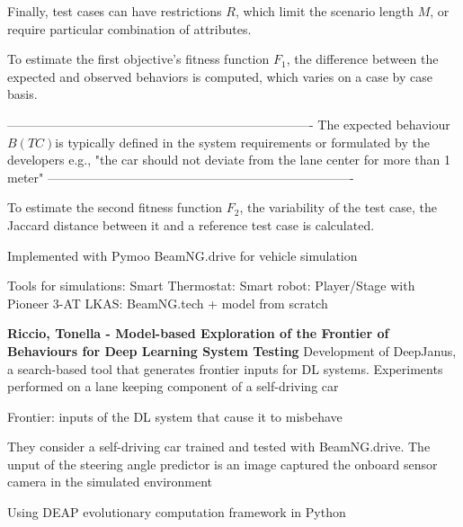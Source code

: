 Finally, test cases can have restrictions $ R $, which limit the scenario length $ M $, or require particular combination of attributes.

To estimate the first objective's fitness function $ F_1 $, the difference between the expected and observed behaviors is computed, which varies on a case by case basis.

-------------------------------------------------------------------------\newline
The expected behaviour $ B(TC) $is typically defined in the system
requirements or formulated by the developers e.g., "the car
should not deviate from the lane center for more than 1
meter"
-------------------------------------------------------------------------\newline

To estimate the second fitness function $ F_2 $, the variability of the test case, the Jaccard distance between it and a reference test case is calculated.

Implemented with Pymoo
BeamNG.drive for vehicle simulation

Tools for simulations:
Smart Thermostat: 
Smart robot: Player/Stage with Pioneer 3-AT
LKAS: BeamNG.tech + model from scratch



\textbf{Riccio, Tonella - Model-based Exploration of the Frontier of Behaviours for Deep Learning System Testing}
Development of DeepJanus, a search-based tool that generates frontier inputs for DL systems.
Experiments performed on a lane keeping component of a self-driving car 

Frontier: inputs of the DL system that cause it to misbehave

They consider a self-driving car trained and tested with BeamNG.drive. The unput of the steering angle predictor is an image captured the onboard sensor camera in the simulated environment

Using DEAP evolutionary computation framework in Python